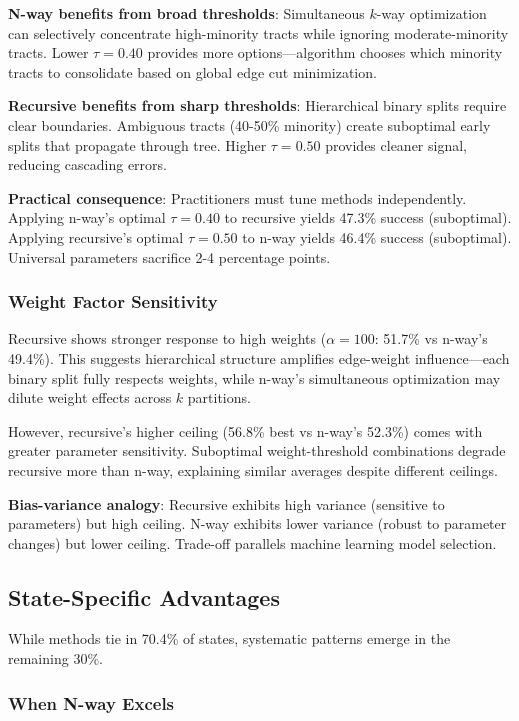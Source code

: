 \textbf{N-way benefits from broad thresholds}: Simultaneous $k$-way optimization can selectively concentrate high-minority tracts while ignoring moderate-minority tracts. Lower $\tau=0.40$ provides more options—algorithm chooses which minority tracts to consolidate based on global edge cut minimization.

\textbf{Recursive benefits from sharp thresholds}: Hierarchical binary splits require clear boundaries. Ambiguous tracts (40-50\% minority) create suboptimal early splits that propagate through tree. Higher $\tau=0.50$ provides cleaner signal, reducing cascading errors.

\textbf{Practical consequence}: Practitioners must tune methods independently. Applying n-way's optimal $\tau=0.40$ to recursive yields 47.3\% success (suboptimal). Applying recursive's optimal $\tau=0.50$ to n-way yields 46.4\% success (suboptimal). Universal parameters sacrifice 2-4 percentage points.

\subsubsection{Weight Factor Sensitivity}

Recursive shows stronger response to high weights ($\alpha=100$: 51.7\% vs n-way's 49.4\%). This suggests hierarchical structure amplifies edge-weight influence—each binary split fully respects weights, while n-way's simultaneous optimization may dilute weight effects across $k$ partitions.

However, recursive's higher ceiling (56.8\% best vs n-way's 52.3\%) comes with greater parameter sensitivity. Suboptimal weight-threshold combinations degrade recursive more than n-way, explaining similar averages despite different ceilings.

\textbf{Bias-variance analogy}: Recursive exhibits high variance (sensitive to parameters) but high ceiling. N-way exhibits lower variance (robust to parameter changes) but lower ceiling. Trade-off parallels machine learning model selection.

\subsection{State-Specific Advantages}

While methods tie in 70.4\% of states, systematic patterns emerge in the remaining 30\%.

\subsubsection{When N-way Excels}

